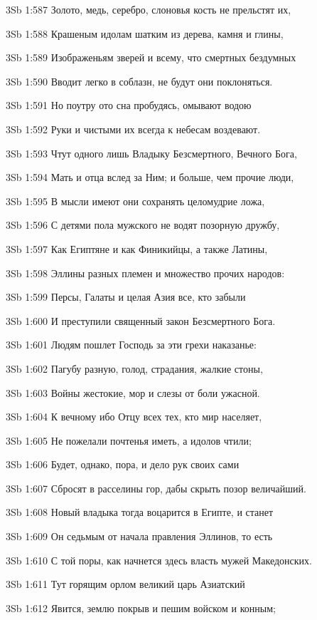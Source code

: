 \vs 3Sb 1:587 Золото, медь, серебро, слоновья кость не прельстят их, 

\vs 3Sb 1:588 Крашеным идолам шатким из дерева, камня и глины, 

\vs 3Sb 1:589 Изображеньям зверей и всему, что смертных бездумных

\vs 3Sb 1:590 Вводит легко в соблазн, не будут они поклоняться. 

\vs 3Sb 1:591 Но поутру ото сна пробудясь, омывают водою 

\vs 3Sb 1:592 Руки и чистыми их всегда к небесам воздевают. 

\vs 3Sb 1:593 Чтут одного лишь Владыку  Безсмертного, Вечного Бога, 

\vs 3Sb 1:594 Мать и отца вслед за Ним; и больше, чем прочие люди,

\vs 3Sb 1:595 В мысли имеют они сохранять целомудрие ложа, 

\vs 3Sb 1:596 С детями пола мужского не водят позорную дружбу, 

\vs 3Sb 1:597 Как Египтяне и как Финикийцы, а также Латины, 

\vs 3Sb 1:598 Эллины разных племен и множество прочих народов: 

\vs 3Sb 1:599 Персы, Галаты и целая Азия  все, кто забыли

\vs 3Sb 1:600 И преступили священный закон Безсмертного Бога. 

\vs 3Sb 1:601 Людям пошлет Господь за эти грехи наказанье: 

\vs 3Sb 1:602 Пагубу разную, голод, страдания, жалкие стоны, 

\vs 3Sb 1:603 Войны жестокие, мор и слезы от боли ужасной. 

\vs 3Sb 1:604 К вечному ибо Отцу всех тех, кто мир населяет,

\vs 3Sb 1:605 Не пожелали почтенья иметь, а идолов чтили; 

\vs 3Sb 1:606 Будет, однако, пора, и дело рук своих сами 

\vs 3Sb 1:607 Сбросят в расселины гор, дабы скрыть позор величайший. 

\vs 3Sb 1:608 Новый владыка тогда воцарится в Египте, и станет 

\vs 3Sb 1:609 Он седьмым от начала правления Эллинов, то есть

\vs 3Sb 1:610 С той поры, как начнется здесь власть мужей Македонских. 

\vs 3Sb 1:611 Тут горящим орлом великий царь Азиатский 

\vs 3Sb 1:612 Явится, землю покрыв и пешим войском и конным; 

